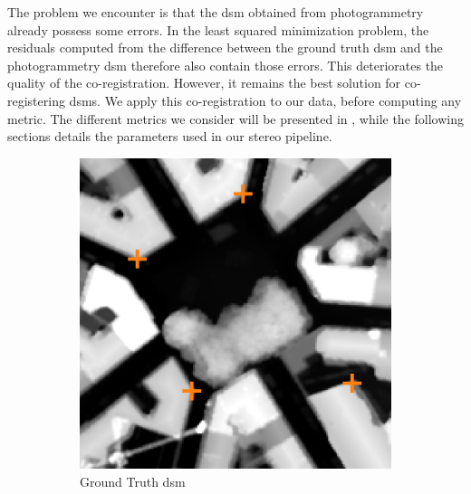 The problem we encounter is that the \acrshort{dsm} obtained from photogrammetry already possess some errors. In the least squared minimization problem, the residuals computed from the difference between the ground truth \acrshort{dsm} and the photogrammetry \acrshort{dsm} therefore also contain those errors. This deteriorates the quality of the co-registration. However, it remains the best solution for co-registering \acrshort{dsm}s. We apply this co-registration to our data, before computing any metric. The different metrics we consider will be presented in , while the following sections details the parameters used in our stereo pipeline.

\begin{figure}
    \centering
    \begin{subfigure}[t]{0.48\linewidth}
        \centering
        \includegraphics[width=\linewidth]{Images/Chap_6/coregisration_planimetric_shift_gt_toulouse.png}
        \caption{Ground Truth \acrshort{dsm}}
        \label{fig:coregistration_planimetric_gt}
    \end{subfigure}\hfill
    \begin{subfigure}[t]{0.48\linewidth}
        \flushright

\end{subfigure}
\end{figure}

